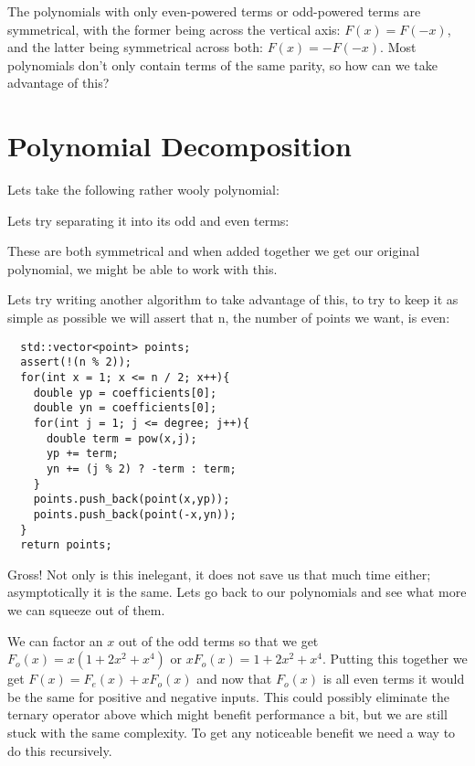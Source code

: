 \documentclass[12pt]{article}
\begin{document}
The polynomials with only even-powered terms or odd-powered terms are symmetrical, with the former being across the vertical axis: $F(x) = F(-x)$, and the latter being symmetrical across both: $F(x) = -F(-x)$. Most polynomials don't only contain terms of the same parity, so how can we take advantage of this?

\pagebreak

\section{Polynomial Decomposition}

Lets take the following rather wooly polynomial:


Lets try separating it into its odd and even terms:

\begin{multicols}{2}
\end{multicols}

These are both symmetrical and when added together we get our original polynomial, we might be able to work with this.

\pagebreak

Lets try writing another algorithm to take advantage of this, to try to keep it as simple as possible we will assert that n, the number of points we want, is even:

\begin{lstlisting}
  std::vector<point> points;
  assert(!(n % 2));
  for(int x = 1; x <= n / 2; x++){
    double yp = coefficients[0];
    double yn = coefficients[0];
    for(int j = 1; j <= degree; j++){
      double term = pow(x,j);
      yp += term;
      yn += (j % 2) ? -term : term;
    }
    points.push_back(point(x,yp));
    points.push_back(point(-x,yn));
  }
  return points;
\end{lstlisting}

Gross! Not only is this inelegant, it does not save us that much time either; asymptotically it is the same. Lets go back to our polynomials and see what more we can squeeze out of them.

We can factor an $x$ out of the odd terms so that we get $F_o(x)=x(1+2x^2+x^4)$ or $x F_o(x)=1+2x^2+x^4$. Putting this together we get $F(x) = F_e(x) + xF_o(x)$ and now that $F_o(x)$ is all even terms it would be the same for positive and negative inputs. This could possibly eliminate the ternary operator above which might benefit performance a bit, but we are still stuck with the same complexity. To get any noticeable benefit we need a way to do this recursively.
\end{document}
